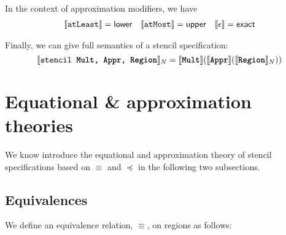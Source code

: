 \documentclass[acmlarge,review]{acmart}
\theoremstyle{definition}
\theoremstyle{plain}
\theoremstyle{remark}
\begin{document}
In the context of approximation modifiers, we have
%
\begin{align*}
  \llbracket{} {\texttt{atLeast}} \rrbracket{} & = \textsf{lower} &
  \llbracket{} {\texttt{atMost}} \rrbracket{} & = \textsf{upper} &
  \llbracket \epsilon \rrbracket = \textsf{exact}
\end{align*}

Finally, we can give full semantics of a stencil specification:
%
\begin{equation*}
  \llbracket{} {\texttt{stencil \texttt{\textbf{Mult}}, \texttt{\textbf{Appr}}, \texttt{\textbf{Region}}}} \rrbracket{}_N =
    \llbracket{} {\texttt{\textbf{Mult}}} \rrbracket{}
           {(\llbracket{} {\texttt{\textbf{Appr}}} \rrbracket{}
                    {(\llbracket{} {\texttt{\textbf{Region}}} \rrbracket{}_N)})}
\end{equation*}

\section{Equational \& approximation theories}

We know introduce the equational and approximation theory of stencil
specifications based on $\equiv$ and $\preceq$ in the following two subsections.

\subsection{Equivalences}

We define an equivalence relation, $\equiv$, on regions as follows:
\end{document}
